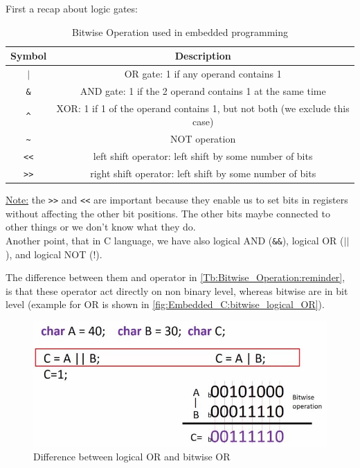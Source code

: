 First a recap about logic gates:


\begin{table}[!h]
\centering
\begin{tabular}{c| c }
Symbol 	& Description\\ \hline
$|$	& OR gate: 1 if any operand contains 1  \\ \hline
\verb|&|	& AND gate: 1 if the 2 operand contains 1 at the same time  \\ \hline
\verb|^| & XOR: 1 if 1 of the operand contains 1, but not both (we exclude this case) \\ \hline
\verb|~|& NOT operation \\ \hline
\verb|<<| & left shift operator: left shift by some number of bits \\ \hline
\verb|>>| & right shift operator: left shift by some number of bits \\ \hline

\end{tabular}
\caption{Bitwise Operation used in embedded programming}
\label{Tb:Bitwise_Operation:reminder}
\end{table}

\underline{Note:} the \verb|>>| and \verb|<<| are important because they enable us to set bits in registers without affecting the other bit positions. The other bits maybe connected to other things or we don't know what they do.\\

Another point, that in C language, we have also logical AND (\verb|&&|), logical OR ($||$), and logical NOT (!). 

The difference between them and operator in \autoref{Tb:Bitwise_Operation:reminder}, is that these operator act directly on non binary level, whereas bitwise are in bit level (example for OR is shown in \autoref{fig:Embedded_C:bitwise_logical_OR}).

\begin{figure}[h]
\centering
\includegraphics[scale=0.5]{Figures/Embedded_C/bitwise_logical_OR}
\caption{Difference between logical OR and bitwise OR}
\label{fig:Embedded_C:bitwise_logical_OR}
\end{figure} 

